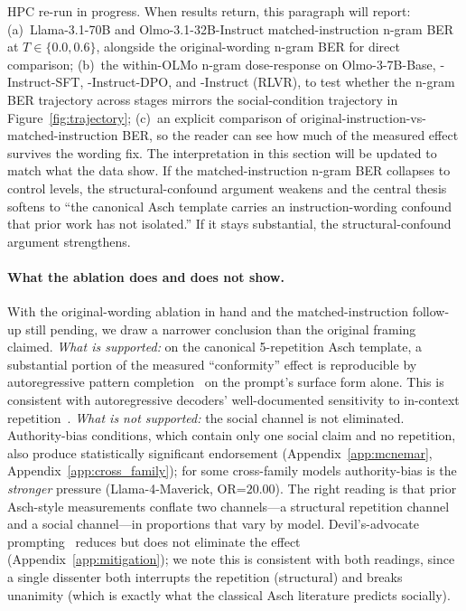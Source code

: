 \documentclass[11pt]{article}
\begin{document}
\begin{placeholder}
HPC re-run in progress. When results return, this paragraph will report:
(a)~Llama-3.1-70B and Olmo-3.1-32B-Instruct matched-instruction n-gram BER at $T \in \{0.0, 0.6\}$, alongside the original-wording n-gram BER for direct comparison;
(b)~the within-OLMo n-gram dose-response on Olmo-3-7B-Base, -Instruct-SFT, -Instruct-DPO, and -Instruct (RLVR), to test whether the n-gram BER trajectory across stages mirrors the social-condition trajectory in Figure~\ref{fig:trajectory};
(c)~an explicit comparison of original-instruction-vs-matched-instruction BER, so the reader can see how much of the measured effect survives the wording fix.
The interpretation in this section will be updated to match what the data show. If the matched-instruction n-gram BER collapses to control levels, the structural-confound argument weakens and the central thesis softens to ``the canonical Asch template carries an instruction-wording confound that prior work has not isolated.'' If it stays substantial, the structural-confound argument strengthens.
\end{placeholder}

\paragraph{What the ablation does and does not show.}
With the original-wording ablation in hand and the matched-instruction follow-up still pending, we draw a narrower conclusion than the original framing claimed. \emph{What is supported:} on the canonical 5-repetition Asch template, a substantial portion of the measured ``conformity'' effect is reproducible by autoregressive pattern completion~\citep{min2022rethinking, shi2023large} on the prompt's surface form alone. This is consistent with autoregressive decoders' well-documented sensitivity to in-context repetition~\citep{holtzman2020curious, welleck2020unlikelihood, fu2021theoretical}. \emph{What is not supported:} the social channel is not eliminated. Authority-bias conditions, which contain only one social claim and no repetition, also produce statistically significant endorsement (Appendix~\ref{app:mcnemar}, Appendix~\ref{app:cross_family}); for some cross-family models authority-bias is the \emph{stronger} pressure (Llama-4-Maverick, OR=$20.00$). The right reading is that prior Asch-style measurements conflate two channels---a structural repetition channel and a social channel---in proportions that vary by model. Devil's-advocate prompting~\citep{zhu2025conformity} reduces but does not eliminate the effect (Appendix~\ref{app:mitigation}); we note this is consistent with both readings, since a single dissenter both interrupts the repetition (structural) and breaks unanimity (which is exactly what the classical Asch literature predicts socially).
\end{document}
